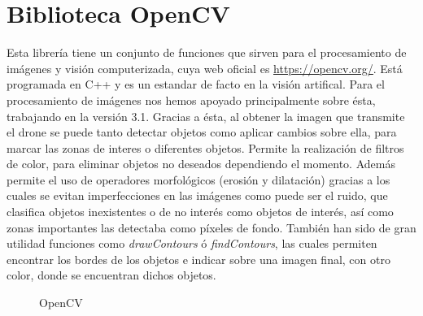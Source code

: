 \section{Biblioteca OpenCV}
\label{sec:BibliotecaOpenCV} 
\hspace{1 cm} Esta librer\'ia tiene un conjunto de funciones que sirven para el procesamiento de im\'agenes y visi\'on computerizada, cuya web oficial es \underline{\url{https://opencv.org/}}. Est\'a programada en C++ y es un estandar de facto en la visi\'on artifical. Para el procesamiento de im\'agenes nos hemos apoyado principalmente sobre \'esta, trabajando en la versi\'on 3.1. Gracias a \'esta, al obtener la imagen que transmite el drone se puede tanto detectar objetos como aplicar cambios sobre ella, para marcar las zonas de interes o diferentes objetos. Permite la realizaci\'on de filtros de color, para eliminar objetos no deseados dependiendo el momento. Adem\'as permite el uso de operadores morfol\'ogicos (erosi\'on y dilataci\'on) gracias a los cuales se evitan imperfecciones en las im\'agenes como puede ser el ruido, que clasifica objetos inexistentes o de no inter\'es como objetos de inter\'es, as\'i como zonas importantes las detectaba como p\'ixeles de fondo. Tambi\'en han sido de gran utilidad funciones como \textit{drawContours} \'o \textit{findContours}, las cuales permiten encontrar los bordes de los objetos e indicar sobre una imagen final, con otro color, donde se encuentran dichos objetos. 



\begin{figure}[H]
 \centering
 \caption{OpenCV}
 \label{f:OpenCV}
\end{figure} 









